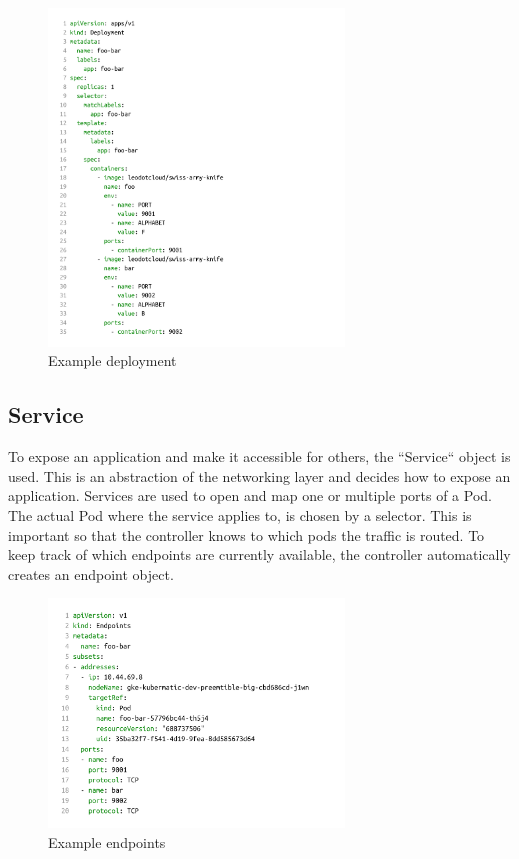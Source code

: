 \begin{figure}[H]
    \centering
    \includegraphics[width=0.7\textwidth, left]{media/02/deployment}
    \caption{Example deployment}
    \label{fig:deployment}
\end{figure}


\subsection{Service}
To expose an application and make it accessible for others, the ``Service`` object is used.
This is an abstraction of the networking layer and decides how to expose an application.
Services are used to open and map one or multiple ports of a Pod.
The actual Pod where the service applies to, is chosen by a selector.
This is important so that the controller knows to which pods the traffic is routed.
To keep track of which endpoints are currently available, the controller automatically creates an endpoint object.

\begin{figure}[H]
    \centering
    \includegraphics[width=0.7\textwidth, left]{media/02/endpoint}
    \caption{Example endpoints}
    \label{fig:endpoints}
\end{figure}

